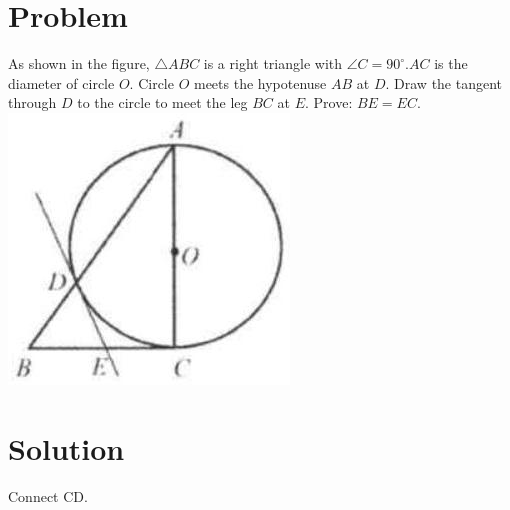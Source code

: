\documentclass{article}
\begin{document}
\section*{Problem}
As shown in the figure, \(\triangle A B C\) is a right triangle with \(\angle C=90^{\circ} . A C\) is the diameter of circle \(O\). Circle \(O\) meets the hypotenuse \(A B\) at \(D\). Draw the tangent through \(D\) to the circle to meet the leg \(B C\) at \(E\). Prove: \(B E=E C\).\\
\centering
\includegraphics[width=\textwidth]{images/169(3).jpg}

\section*{Solution}
Connect CD.
\end{document}
